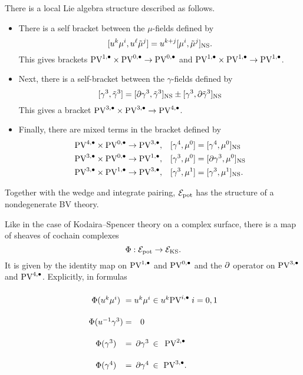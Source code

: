 \documentclass[11pt]{article}
\newcommand{\surya}[1]{(\textcolor{red}{Surya: #1})}
\newcommand\bu{\bullet}
\begin{document}
There is a local Lie algebra structure described as follows.
\begin{itemize}
\item 
There is a self bracket between the $\mu$-fields defined by
\[
[u^k \mu^i, u^\ell \Tilde{\mu}^j] = u^{k+j} [\mu^i, \Tilde{\mu}^j]_{\rm NS} .
    \]
    This gives brackets $\PV^{1,\bu}\times \PV^{0,\bu}\to \PV^{0,\bu}$ and $\PV^{1,\bu}\times\PV^{1,\bu}\to \PV^{1,\bu}$.
  \item Next, there is a self-bracket between the $\gamma$-fields defined by
\[
[\gamma^3, \Tilde{\gamma}^3] = [\partial \gamma^3 , \Tilde{\gamma}^{3}]_{\rm NS} \pm [\gamma^3, \partial \Tilde{\gamma}^{3}]_{\rm NS}
    \]
This gives a bracket $\PV^{3,\bu}\times \PV^{3,\bu}\to \PV^{4,\bu}$.
\item Finally, there are mixed terms in the bracket defined by
    \begin{align*}
      \PV^{4,\bu}\times \PV^{0,\bu}\to \PV^{3,\bu}, \ \ \ & [\gamma^{4}, \mu^{0}] = [\gamma^{4}, \mu^{0}]_{\rm {NS}}\\
      \PV^{3,\bu}\times \PV^{0,\bu}\to \PV^{1,\bu}, \ \ \ & [\gamma^{3}, \mu^{0}] = [\del\gamma^{3}, \mu^{0}]_{\rm NS}\\
      \PV^{3,\bu}\times \PV^{1,\bu}\to \PV^{3,\bu}, \ \ \ & [\gamma^{3}, \mu^{1}] = [\gamma^{3}, \mu^{1}]_{\rm NS}.
    \end{align*}
\end{itemize}

Together with the wedge and integrate pairing, $\mathcal{E}_{\rm pot}$ has the structure of a nondegenerate BV theory.

Like in the case of Kodaira--Spencer theory on a complex surface, there is a  map of sheaves of cochain complexes 
\[
\Phi: \mathcal{E}_{\rm pot}\to \mathcal{E}_{\rm KS} .
\] 
It is given by the identity map on $\PV^{1,\bu}$ and $\PV^{0,\bu}$ and the $\partial$ operator on $\PV^{3,\bu}$ and $\PV^{4,\bu}$. 
Explicitly, in formulas
\[
\arraycolsep=1.4pt\def\arraystretch{2.2}
\begin{array}{ccccccccc}
\Phi(u^k \mu^{i}) & = & u^k \mu^i & \in & u^k \PV^{i, \bu} & i = 0,1 \\
\Phi(u^{-1} \gamma^3) & = & 0 \\
\Phi(\gamma^3) & = & \partial \gamma^3 & \in & \PV^{2,\bu} \\
\Phi(\gamma^4) & = & \partial \gamma^4 & \in & \PV^{3,\bu} .
\end{array} 
\]

\end{document}
